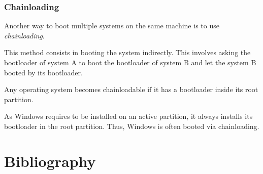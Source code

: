 \begin{frame}
  \frametitle{Chainloading}

  Another way to boot multiple systems on the same machine is to use {\em chainloading}.

  \-

  This method consists in booting the system indirectly. This involves asking the bootloader of system A to boot the bootloader of system B and let the system B booted by its bootloader.

  \-

  Any operating system becomes chainloadable if it has a bootloader inside its root partition.

  \-

  As Windows requires to be installed on an active partition, it always installs its bootloader in the root partition. Thus, Windows is often booted via chainloading.

\end{frame}

%
%

\section{Bibliography}

\begin{thebibliography}{4}


\end{thebibliography}


